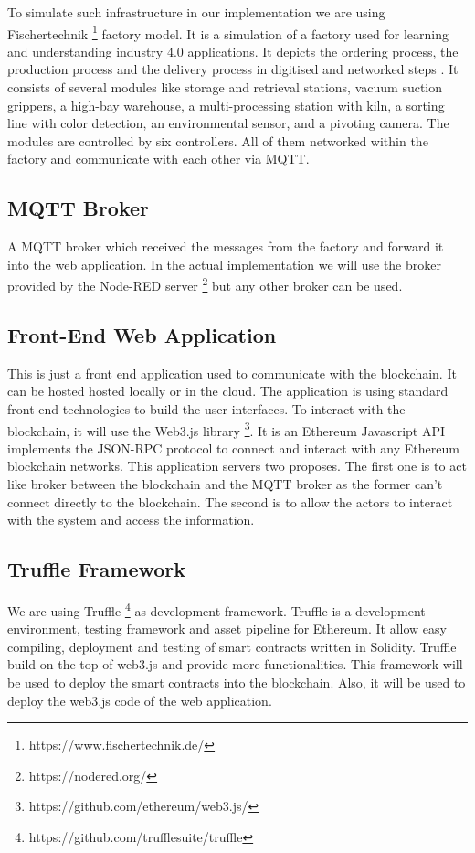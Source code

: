 \documentclass[runningheads]{llncs}
\begin{document}
\bigbreak

\noindent To simulate such infrastructure in our implementation we are using Fischertechnik \footnote{https://www.fischertechnik.de/} factory model. It is a simulation of a factory used for learning and understanding industry 4.0 applications. It depicts the ordering process, the production process and the delivery process in digitised and networked steps \cite{Industry}. It consists of several modules like storage and retrieval stations, vacuum suction grippers, a high-bay warehouse, a multi-processing station with kiln, a sorting line with color detection, an environmental sensor, and a pivoting camera. The modules are controlled by six controllers. All of them networked within the factory and communicate with each other via MQTT.


\subsection{MQTT Broker}
A MQTT broker which received the messages from the factory and forward it into the web application. In the actual implementation we will use the broker provided by the Node-RED server \footnote{https://nodered.org/} but any other broker can be used.

\subsection{Front-End Web Application}
This is just a front end application used to communicate with the blockchain. It can be hosted hosted locally or in the cloud. The application is using standard front end technologies to build the user interfaces. To interact with the blockchain, it will use the Web3.js library \footnote{https://github.com/ethereum/web3.js/}. It is an Ethereum Javascript API implements the JSON-RPC protocol to connect and interact with any Ethereum blockchain networks. This application servers two proposes. The first one is to act like broker between the blockchain and the MQTT broker as the former can't connect directly to the blockchain. The second is to allow the actors to interact with the system and access the information. 


\subsection{Truffle Framework}
We are using Truffle \footnote{https://github.com/trufflesuite/truffle} as development framework. Truffle is a development environment, testing framework and asset pipeline for Ethereum. It allow easy compiling, deployment and testing of smart contracts written in Solidity. Truffle build on the top of web3.js and provide more functionalities. This framework will be used to deploy the smart contracts into the blockchain. Also, it will be used to deploy the web3.js code of the web application. 
\end{document}
